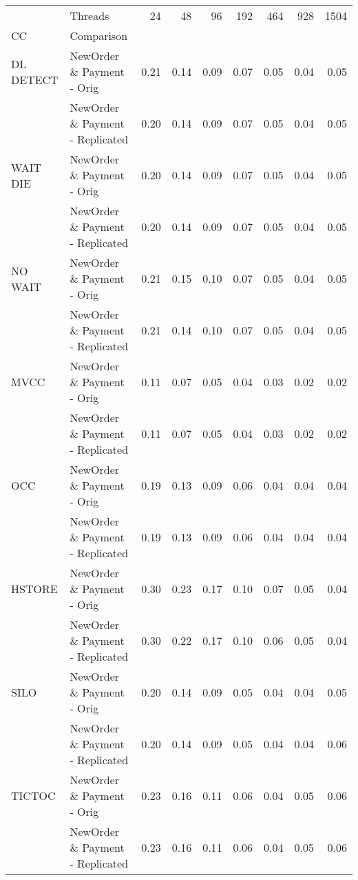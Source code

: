 \begin{tabular}{llrrrrrrr}
\toprule
       & Threads &  24   &  48   &  96   &  192  &  464  &  928  &  1504 \\
CC & Comparison &       &       &       &       &       &       &       \\
\midrule
DL DETECT & NewOrder \& Payment - Orig &  0.21 &  0.14 &  0.09 &  0.07 &  0.05 &  0.04 &  0.05 \\
       & NewOrder \& Payment - Replicated &  0.20 &  0.14 &  0.09 &  0.07 &  0.05 &  0.04 &  0.05 \\
WAIT DIE & NewOrder \& Payment - Orig &  0.20 &  0.14 &  0.09 &  0.07 &  0.05 &  0.04 &  0.05 \\
       & NewOrder \& Payment - Replicated &  0.20 &  0.14 &  0.09 &  0.07 &  0.05 &  0.04 &  0.05 \\
NO WAIT & NewOrder \& Payment - Orig &  0.21 &  0.15 &  0.10 &  0.07 &  0.05 &  0.04 &  0.05 \\
       & NewOrder \& Payment - Replicated &  0.21 &  0.14 &  0.10 &  0.07 &  0.05 &  0.04 &  0.05 \\
MVCC & NewOrder \& Payment - Orig &  0.11 &  0.07 &  0.05 &  0.04 &  0.03 &  0.02 &  0.02 \\
       & NewOrder \& Payment - Replicated &  0.11 &  0.07 &  0.05 &  0.04 &  0.03 &  0.02 &  0.02 \\
OCC & NewOrder \& Payment - Orig &  0.19 &  0.13 &  0.09 &  0.06 &  0.04 &  0.04 &  0.04 \\
       & NewOrder \& Payment - Replicated &  0.19 &  0.13 &  0.09 &  0.06 &  0.04 &  0.04 &  0.04 \\
HSTORE & NewOrder \& Payment - Orig &  0.30 &  0.23 &  0.17 &  0.10 &  0.07 &  0.05 &  0.04 \\
       & NewOrder \& Payment - Replicated &  0.30 &  0.22 &  0.17 &  0.10 &  0.06 &  0.05 &  0.04 \\
SILO & NewOrder \& Payment - Orig &  0.20 &  0.14 &  0.09 &  0.05 &  0.04 &  0.04 &  0.05 \\
       & NewOrder \& Payment - Replicated &  0.20 &  0.14 &  0.09 &  0.05 &  0.04 &  0.04 &  0.06 \\
TICTOC & NewOrder \& Payment - Orig &  0.23 &  0.16 &  0.11 &  0.06 &  0.04 &  0.05 &  0.06 \\
       & NewOrder \& Payment - Replicated &  0.23 &  0.16 &  0.11 &  0.06 &  0.04 &  0.05 &  0.06 \\
\bottomrule
\end{tabular}
